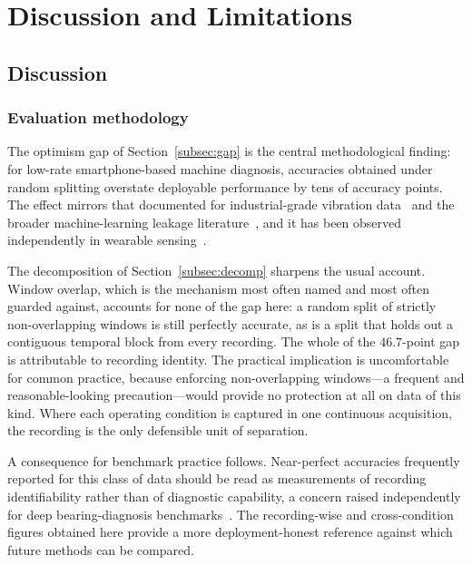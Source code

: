 
\section{Discussion and Limitations}
\label{sec:discussion}

\subsection{Discussion}

\subsubsection{Evaluation methodology}
The optimism gap of Section~\ref{subsec:gap} is the central methodological
finding: for low-rate smartphone-based machine diagnosis, accuracies obtained
under random splitting overstate deployable performance by tens of accuracy
points. The effect mirrors that documented for industrial-grade vibration
data~\cite{wheat2024impact, hendriks2022towards} and the broader
machine-learning leakage literature~\cite{kapoor2023leakage, lones2024leakage},
and it has been observed independently in wearable
sensing~\cite{gholamiangonabadi2020cv}.

The decomposition of Section~\ref{subsec:decomp} sharpens the usual account.
Window overlap, which is the mechanism most often named and most often guarded
against, accounts for none of the gap here: a random split of strictly
non-overlapping windows is still perfectly accurate, as is a split that holds out
a contiguous temporal block from every recording. The whole of the $46.7$-point
gap is attributable to recording identity. The practical implication is
uncomfortable for common practice, because enforcing non-overlapping windows---a
frequent and reasonable-looking precaution---would provide no protection at all on
data of this kind. Where each operating condition is captured in one continuous
acquisition, the recording is the only defensible unit of separation.

A consequence for benchmark practice follows. Near-perfect accuracies frequently
reported for this class of data should be read as measurements of recording
identifiability rather than of diagnostic capability, a concern raised
independently for deep bearing-diagnosis benchmarks~\cite{wang2026benchmark}. The
recording-wise and cross-condition figures obtained here provide a more
deployment-honest reference against which future methods can be compared.

